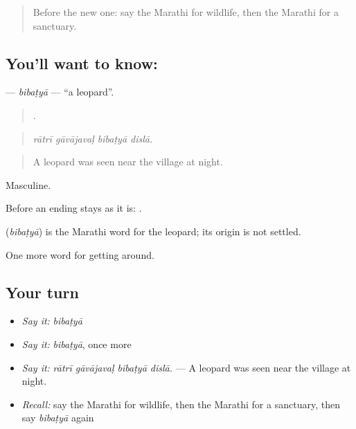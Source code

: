 \label{lesson:MR-C446-bibatya}



\begin{quote}
Before the new one: say the Marathi for wildlife, then the Marathi for a sanctuary.
\end{quote}

\subsection*{You'll want to know: }
\textbf{} — \emph{bibaṭyā} — \textquotedblleft{}a leopard\textquotedblright{}.

\begin{quote}
   .
\end{quote}

\begin{quote}
\emph{rātrī gāvājavaḷ bibaṭyā dislā.}
\end{quote}

\begin{quote}
A leopard was seen near the village at night.
\end{quote}

Masculine.

Before an ending  stays as it is: .

\begin{cousinweb}
\textbf{} (\emph{bibaṭyā}) is the Marathi word for the leopard; its origin is not settled.
\end{cousinweb}

\begin{grammarlens}[title={What you've built}]
One more word for getting around.
\end{grammarlens}

\subsection*{Your turn}
\begin{itemize}
\raggedright
  \item \emph{Say it:} \emph{bibaṭyā}
  \item \emph{Say it:} \emph{bibaṭyā}, once more
  \item \emph{Say it:} \emph{rātrī gāvājavaḷ bibaṭyā dislā.} — A leopard was seen near the village at night.
  \item \emph{Recall:} say the Marathi for wildlife, then the Marathi for a sanctuary, then say \emph{bibaṭyā} again
\end{itemize}

